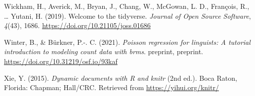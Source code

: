 \documentclass[
  11pt,
  english,
  ,doc,floatsintext]{apa6}
\newlength{\cslhangindent}
\newlength{\cslentryspacingunit} %
\newenvironment{CSLReferences}[2] %
 {%
  \setlength{\parindent}{0pt}
  \ifodd #1
  \let\oldpar\par
  \def\par{\hangindent=\cslhangindent\oldpar}
  \fi
  \setlength{\parskip}{#2\cslentryspacingunit}
 }%
 {}
\begin{document}
\begin{CSLReferences}{1}{0}
\leavevmode{}%
Wickham, H., Averick, M., Bryan, J., Chang, W., McGowan, L. D., François, R., \ldots{} Yutani, H. (2019). Welcome to the {tidyverse}. \emph{Journal of Open Source Software}, \emph{4}(43), 1686. \url{https://doi.org/10.21105/joss.01686}

\leavevmode{}%
Winter, B., \& Bürkner, P.-. C. (2021). \emph{Poisson regression for linguists: A tutorial introduction to modeling count data with brms}. preprint, preprint. \url{https://doi.org/10.31219/osf.io/93kaf}

\leavevmode{}%
Xie, Y. (2015). \emph{Dynamic documents with {R} and knitr} (2nd ed.). Boca Raton, Florida: Chapman; Hall/CRC. Retrieved from \url{https://yihui.org/knitr/}

\end{CSLReferences}
\end{document}
